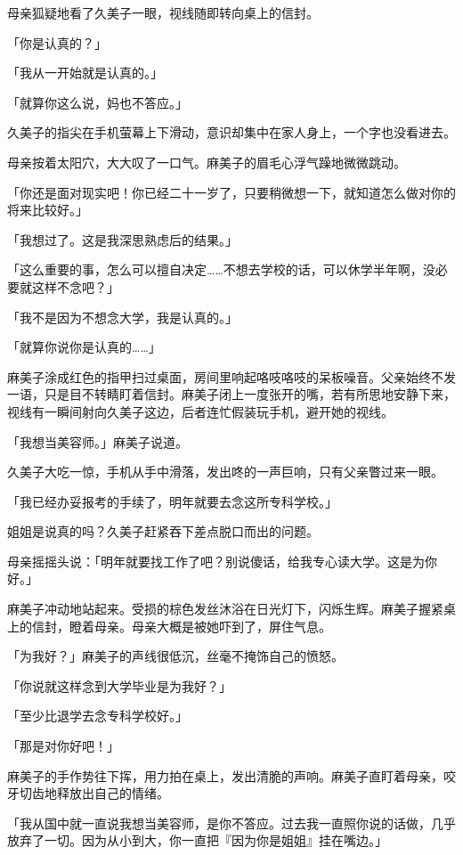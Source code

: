 \documentclass[UTF8]{ctexart}
\begin{document}
    母亲狐疑地看了久美子一眼，视线随即转向桌上的信封。 

    「你是认真的？」 

    「我从一开始就是认真的。」 

    「就算你这么说，妈也不答应。」 

    久美子的指尖在手机萤幕上下滑动，意识却集中在家人身上，一个字也没看进去。 

    母亲按着太阳穴，大大叹了一口气。麻美子的眉毛心浮气躁地微微跳动。 

    「你还是面对现实吧！你已经二十一岁了，只要稍微想一下，就知道怎么做对你的将来比较好。」 

    「我想过了。这是我深思熟虑后的结果。」 

    「这么重要的事，怎么可以擅自决定……不想去学校的话，可以休学半年啊，没必要就这样不念吧？」 

    「我不是因为不想念大学，我是认真的。」 

    「就算你说你是认真的……」 

    麻美子涂成红色的指甲扫过桌面，房间里响起咯吱咯吱的呆板噪音。父亲始终不发一语，只是目不转睛盯着信封。麻美子闭上一度张开的嘴，若有所思地安静下来，视线有一瞬间射向久美子这边，后者连忙假装玩手机，避开她的视线。 

    「我想当美容师。」麻美子说道。 

    久美子大吃一惊，手机从手中滑落，发出咚的一声巨响，只有父亲瞥过来一眼。 

    「我已经办妥报考的手续了，明年就要去念这所专科学校。」 

    姐姐是说真的吗？久美子赶紧吞下差点脱口而出的问题。 

    母亲摇摇头说：「明年就要找工作了吧？别说傻话，给我专心读大学。这是为你好。」 

    麻美子冲动地站起来。受损的棕色发丝沐浴在日光灯下，闪烁生辉。麻美子握紧桌上的信封，瞪着母亲。母亲大概是被她吓到了，屏住气息。 

    「为我好？」麻美子的声线很低沉，丝毫不掩饰自己的愤怒。 

    「你说就这样念到大学毕业是为我好？」 

    「至少比退学去念专科学校好。」 

    「那是对你好吧！」 

    麻美子的手作势往下挥，用力拍在桌上，发出清脆的声响。麻美子直盯着母亲，咬牙切齿地释放出自己的情绪。 

    「我从国中就一直说我想当美容师，是你不答应。过去我一直照你说的话做，几乎放弃了一切。因为从小到大，你一直把『因为你是姐姐』挂在嘴边。」 
\end{document}
